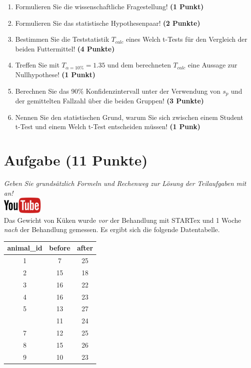 \documentclass[a4paper, 10pt]{scrartcl}\usepackage[]{graphicx}\usepackage[]{xcolor}
\begin{document}
\begin{enumerate}
  \item Formulieren Sie die wissenschaftliche Fragestellung! \textbf{(1 Punkt)}
  \item Formulieren Sie das statistische Hypothesenpaar! \textbf{(2
      Punkte)}
  \item Bestimmen Sie die Teststatistik $T_{calc}$ eines Welch t-Tests f{\"u}r den
  Vergleich der beiden Futtermittel! \textbf{(4 Punkte)}
\item Treffen Sie mit $T_{\alpha = 10\%} = 1.35$ und dem berechneten $T_{calc}$ eine Aussage
  zur Nullhypothese! \textbf{(1 Punkt)}
\item Berechnen Sie das 90\% Konfidenzintervall unter der
  Verwendung von $s_p$ und der gemittelten Fallzahl {\"u}ber die beiden Gruppen! \textbf{(3 Punkte)}
\item Nennen Sie den statistischen Grund, warum Sie sich zwischen einem Student t-Test und einem
  Welch t-Test entscheiden m{\"u}ssen! \textbf{(1 Punk)}
\end{enumerate} 
\clearpage

\section{Aufgabe \hfill (11 Punkte)}

\textit{Geben Sie grunds{\"a}tzlich Formeln und Rechenweg zur L{\"o}sung der
  Teilaufgaben mit an!} \\[1Ex]

\hfill\href{https://youtu.be/QR90zyn0Iz8}{\includegraphics[width =
  2cm]{img/youtube}}\\[1Ex]


Das Gewicht von K{\"u}ken wurde \textit{vor} der Behandlung mit STARTex und 1
Woche \textit{nach} der Behandlung gemessen. Es ergibt sich die folgende
Datentabelle.

\begin{table}[!h]
\centering
\begin{tabular}{ccc}
\toprule
animal\_id & before & after\\
\midrule
1 & 7 & 25\\
2 & 15 & 18\\
3 & 16 & 22\\
4 & 16 & 23\\
5 & 13 & 27\\
\addlinespace
6 & 11 & 24\\
7 & 12 & 25\\
8 & 15 & 26\\
9 & 10 & 23\\
\bottomrule
\end{tabular}
\end{table}
\end{document}
